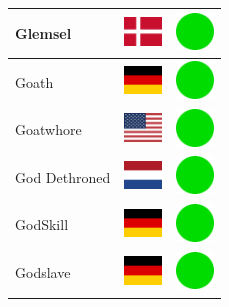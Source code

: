 \documentclass[12pt, a4paper, twoside]{report}
\begin{document}
\begin{center}
\begin{longtable}{|p{5cm}|p{2cm}|p{2cm}|}
Glemsel & \includegraphics[width=1cm]{4x3/dk} & \includegraphics[width=1cm]{likes/y} \\ \hline
Goath & \includegraphics[width=1cm]{4x3/de} & \includegraphics[width=1cm]{likes/y} \\ \hline
Goatwhore & \includegraphics[width=1cm]{4x3/us} & \includegraphics[width=1cm]{likes/y} \\ \hline
God Dethroned & \includegraphics[width=1cm]{4x3/nl} & \includegraphics[width=1cm]{likes/y} \\ \hline
GodSkill & \includegraphics[width=1cm]{4x3/de} & \includegraphics[width=1cm]{likes/y} \\ \hline
Godslave & \includegraphics[width=1cm]{4x3/de} & \includegraphics[width=1cm]{likes/y} \\ \hline

\end{longtable}
\end{center}
\end{document}
